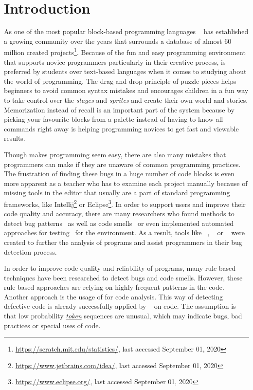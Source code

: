\chapter{Introduction}\label{chap:introduction}

As one of the most popular block-based programming languages \scratch{}~\cite{scratch} has established a growing community over the years that surrounds a database of almost 60 million created projects\footnote{\url{https://scratch.mit.edu/statistics/}, last accessed September 01, 2020}. Because of the fun and easy programming environment that supports novice programmers particularly in their creative process, \scratch{} is preferred by students over text-based languages when it comes to studying about the world of programming. The drag-and-drop principle of puzzle pieces helps beginners to avoid common syntax mistakes and encourages children in a fun way to take control over the \textit{stages} and \textit{sprites} and create their own world and stories. Memorization instead of recall is an important part of the \scratch{} system because by picking your favourite blocks from a palette instead of having to know all commands right away is helping programming novices to get fast and viewable results. 

Though \scratch{} makes programming seem easy, there are also many mistakes that programmers can make if they are unaware of common programming practices. The frustration of finding these bugs in a huge number of code blocks is even more apparent as a teacher who has to examine each project manually because of missing tools in the \scratch{} editor that usually are a part of standard programming frameworks, like Intellij\footnote{\url{https://www.jetbrains.com/idea/}, last accessed September 01, 2020} or Eclipse\footnote{\url{https://www.eclipse.org/}, last accessed September 01, 2020}. In order to support \scratch{} users and improve their code quality and accuracy, there are many researchers who found methods to detect bug patterns~\cite{scratch_bugpatterns} as well as code smells~\cite{badsmells, badhabits, hairball} or even implemented automated approaches for testing~\cite{whisker} for the \scratch{} environment. As a result, tools like \hairball~\cite{hairball}, \drscratch~\cite{drscratch} or \litterbox~\cite{scratch_bugpatterns} were created to further the analysis of \scratch{} programs and assist programmers in their bug detection process.

In order to improve code quality and reliability of programs, many rule-based techniques have been researched to detect bugs and code smells. However, these rule-based approaches are relying on highly frequent patterns in the code. Another approach is the usage of  for code analysis. This way of detecting defective code is already successfully applied by \bugram{}~\cite{bugram} on \java{} code. The assumption is that low probability \hyperref[def:token]{\textit{token}} sequences are unusual, which may indicate bugs, bad practices or special uses of code. 

